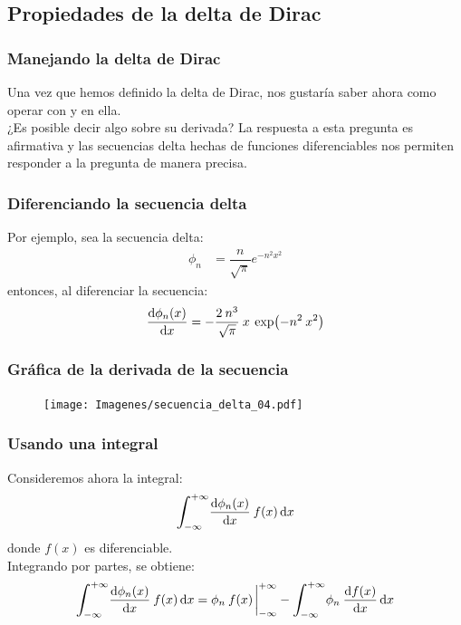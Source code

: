 \documentclass[12pt]{beamer}
\begin{document}
\subsection{Propiedades de la delta de Dirac}

\begin{frame}
\frametitle{Manejando la delta de Dirac}
Una vez que hemos definido la delta de Dirac, nos gustaría saber ahora como operar con y en ella. 
\\
\bigskip
\pause
¿Es posible decir algo sobre su derivada? \pause La respuesta a esta pregunta es afirmativa y las secuencias delta hechas de funciones diferenciables nos permiten responder a la pregunta de manera precisa.
\end{frame}

\begin{frame}
\frametitle{Diferenciando la secuencia delta}
Por ejemplo, sea la secuencia delta:
\pause
\begin{align*}
\phi_{n} &= \dfrac{n}{\sqrt{\pi}} e^{-n^{2} x^{2}}
\end{align*}
\pause
entonces, al diferenciar la secuencia:
\pause
\begin{align*}
\dv{\phi_{n}(x)}{x} = - \dfrac{2 \: n^{3}}{\sqrt{\pi}} \: x \: \exp(-n^{2} \: x^{2})
\end{align*}
\end{frame}

\begin{frame}
\frametitle{Gráfica de la derivada de la secuencia}
\begin{figure}[H]
    \centering
    \texttt{[image: Imagenes/secuencia\_delta\_04.pdf]}
    \label{fig:fig_figura_delta_04}
\end{figure}
\end{frame}

\begin{frame}
\frametitle{Usando una integral}
Consideremos ahora la integral:
\begin{align*}
\scaleint{6ex}_{\bs -\infty}^{+\infty} \dv{\phi_{n}(x)}{x} \: f (x) \dd{x}
\end{align*}
donde $f (x)$ es diferenciable.
\\
\bigskip
\pause
Integrando por partes, se obtiene:
\pause
\begin{align*}
\scaleint{6ex}_{\bs -\infty}^{+\infty} \dv{\phi_{n}(x)}{x} \: f (x) \dd{x} = \phi_{n} \: f (x) \eval_{-\infty}^{+\infty} - \scaleint{6ex}_{\bs -\infty}^{+\infty} \phi_{n} \: \dv{f (x)}{x} \dd{x}
\end{align*}
\end{frame}
\end{document}
